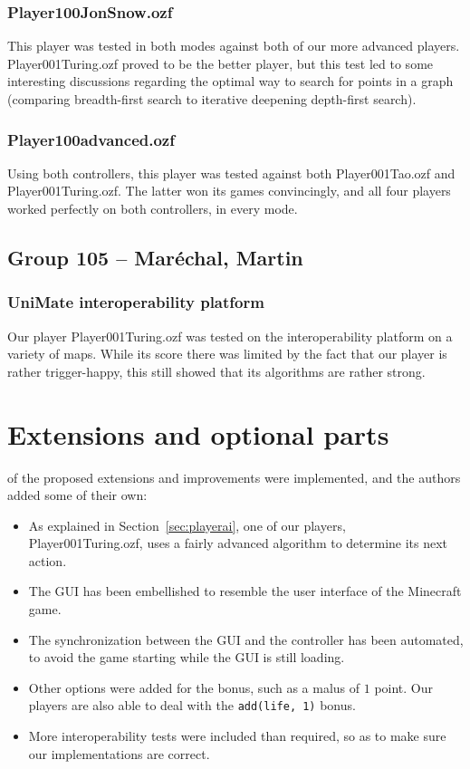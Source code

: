 \documentclass[12pt,journal]{IEEEtran}
\newcommand{\ntt}{\normalfont\ttfamily}
\newcommand{\fn}[1]{{\protect\ntt#1}}
\begin{document}
\subsubsection{Player100JonSnow.ozf}
This player was tested in both modes against both of our more advanced players.
\fn{Player001Turing.ozf} proved to be the better player, but this test led to some interesting discussions regarding the optimal way to search for points in a graph (comparing breadth-first search to iterative deepening depth-first search).

\subsubsection{\fn{Player100advanced.ozf}}
Using both controllers, this player was tested against both \fn{Player001Tao.ozf} and \fn{Player001Turing.ozf}.
The latter won its games convincingly, and all four players worked perfectly on both controllers, in every mode.

\subsection{Group 105 -- Maréchal, Martin}
\subsubsection{UniMate interoperability platform}
Our player \fn{Player001Turing.ozf} was tested on the interoperability platform on a variety of maps.
While its score there was limited by the fact that our player is rather trigger-happy, this still showed that its algorithms are rather strong.

\section{Extensions and optional parts}
\label{sec:extensions}
 of the proposed extensions and improvements were implemented, and the authors added some of their own:
\begin{itemize}
	\item As explained in Section~\ref{sec:playerai}, one of our players,
	\fn{Player001Turing.ozf}, uses a fairly advanced algorithm to determine its next action.
	\item The GUI has been embellished to resemble the user interface of the Minecraft game.
	\item The synchronization between the GUI and the controller has been automated, to avoid the game starting while the GUI is still loading.
	\item Other options were added for the bonus, such as a malus of \(1\) point.
	Our players are also able to deal with the \lstinline|add(life, 1)| bonus.
	\item More interoperability tests were included than required, so as to make sure our implementations are correct.
\end{itemize}
\end{document}

